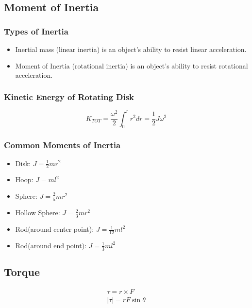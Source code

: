\documentclass[../Notes.tex]{subfiles}
\begin{document}
    \subsection{Moment of Inertia}
    \subsubsection{Types of Inertia}
    \begin{itemize}
        \item Inertial mass (linear inertia) is an object's ability to resist 
            linear acceleration.
        \item Moment of Inertia (rotational inertia) is an object's ability to resist 
            rotational acceleration.
    \end{itemize}

    \subsubsection{Kinetic Energy of Rotating Disk}
    \begin{equation*}
        K_{TOT} = \frac{\omega^2}{2} \int_0^r r^2 dr = \frac12 J \omega^2
    \end{equation*}

    \subsubsection{Common Moments of Inertia}
    \begin{itemize}
        \item Disk: $J = \frac12 mr^2$
        \item Hoop: $J = ml^2$ 
        \item Sphere: $J = \frac25 m r^2$
        \item Hollow Sphere: $J = \frac23 m r^2$
        \item Rod(around center point): $J = \frac1{12} m l^2$
        \item Rod(around end point): $J = \frac13 m l^2$
    \end{itemize}

    \subsection{Torque}
    \begin{align*}
        \tau = r \times F \\
        |\tau| = rF\sin \theta
    \end{align*}
\end{document}
